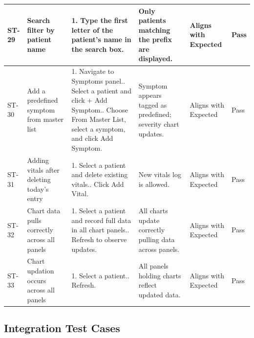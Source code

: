 \documentclass[12pt,a4paper]{article}
\begin{document}
\begin{longtable}{|p{1cm}|p{2.5cm}|p{3.5cm}|p{3.5cm}|p{2cm}|p{1.2cm}|}
    ST-29 & Search filter by patient name &
        1. Type the first letter of the patient's name in the search box. &
        Only patients matching the prefix are displayed. &
        Aligns with Expected & Pass \\
    \hline
 
    ST-30 & Add a predefined symptom from master list &
        1. Navigate to Symptoms panel.\newline
        2. Select a patient and click + Add Symptom.\newline
        3. Choose From Master List, select a symptom, and click Add Symptom. &
        Symptom appears tagged as predefined; severity chart updates. &
        Aligns with Expected & Pass \\
    \hline
 
    ST-31 & Adding vitals after deleting today's entry &
        1. Select a patient and delete existing vitals.\newline
        2. Click Add Vital. &
        New vitals log is allowed. &
        Aligns with Expected & Pass \\
    \hline
 
    ST-32 & Chart data pulls correctly across all panels &
        1. Select a patient and record full data in all chart panels.\newline
        2. Refresh to observe updates. &
        All charts update correctly pulling data across panels. &
        Aligns with Expected & Pass \\
    \hline
 
    ST-33 & Chart updation occurs across all panels &
        1. Select a patient.\newline
        2. Refresh. &
        All panels holding charts reflect updated data. &
        Aligns with Expected & Pass \\
    \hline
 
\end{longtable}
 
 
\subsection{Integration Test Cases}
 
\end{document}
